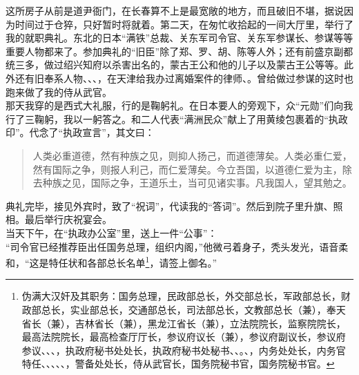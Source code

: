 这所房子从前是道尹衙门，在长春算不上是最宽敞的地方，而且破旧不堪，据说因为时间过于仓猝，只好暂时将就着。第二天，在匆忙收拾起的一间大厅里，举行了我的就职典礼。东北的日本“满铁”总裁、关东军司令官、关东军参谋长、参谋等等重要人物都来了。参加典礼的“旧臣”除了郑、罗、胡、陈等人外；还有前盛京副都统三多，做过绍兴知府以杀害出名的，蒙古王公和他的儿子以及蒙古王公等等。此外还有旧奉系人物、、、，在天津给我办过离婚案件的律师、。曾给做过参谋的这时也跑来做了我的侍从武官。\\

那天我穿的是西式大礼服，行的是鞠躬礼。在日本要人的旁观下，众“元勋”们向我行了三鞠躬，我以一躬答之。和二人代表“满洲民众”献上了用黄绫包裹着的“执政印”。代念了“执政宣言”，其文曰：\\

\begin{quote}
	人类必重道德，然有种族之见，则抑人扬己，而道德薄矣。人类必重仁爱，然有国际之争，则报人利己，而仁爱薄矣。今立吾国，以道德仁爱为主，除去种族之见，国际之争，王道乐土，当可见诸实事。凡我国人，望其勉之。\\
\end{quote}

典礼完毕，接见外宾时，致了“祝词”，代读我的“答词”。然后到院子里升旗、照相。最后举行庆祝宴会。\\

当天下午，在“执政办公室”里，送上一件“公事”：\\

“司令官已经推荐臣出任国务总理，组织内阁，”他微弓着身子，秃头发光，语音柔和，“这是特任状和各部总长名单\footnote{伪满大汉奸及其职务：国务总理，民政部总长，外交部总长，军政部总长，财政部总长，实业部总长，交通部总长，司法部总长，文教部总长（兼），奉天省长（兼），吉林省长（兼），黑龙江省长（兼），立法院院长，监察院院长，最高法院院长，最高检查厅厅长，参议府议长（兼），参议府副议长，参议府参议、、、，执政府秘书处处长，执政府秘书处秘书、、。、，内务处处长，内务官特任、、、、、，警备处处长，侍从武官长，国务院秘书官，国务院秘书官。}，请签上御名。”\\

